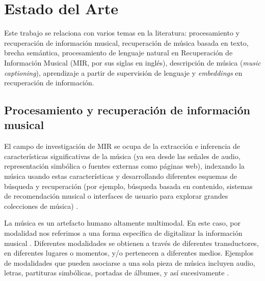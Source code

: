 \chapter{Estado del Arte}
\label{chap:sota}

Este trabajo se relaciona con varios temas en la literatura: procesamiento y recuperación de información musical, recuperación de música basada en texto, brecha semántica, procesamiento de lenguaje natural en Recuperación de Información Musical (MIR, por sus siglas en inglés), descripción de música (\textit{music captioning}), aprendizaje a partir de supervisión de lenguaje y \textit{embeddings} en recuperación de información.\\

\section{Procesamiento y recuperación de información musical}
\label{sec:MIR}

El campo de investigación de MIR se ocupa de la extracción e inferencia de características significativas de la música (ya sea desde las señales de audio, representación simbólica o fuentes externas como páginas web), indexando la música usando estas características y desarrollando diferentes esquemas de búsqueda y recuperación (por ejemplo, búsqueda basada en contenido, sistemas de recomendación musical o interfaces de usuario para explorar grandes colecciones de música) \cite{Schedl2014MusicIR}.

La música es un artefacto humano altamente multimodal. En este caso, por modalidad nos referimos a una forma específica de digitalizar la información musical \cite{Simonetta2019MultimodalMI}. Diferentes modalidades se obtienen a través de diferentes transductores, en diferentes lugares o momentos, y/o pertenecen a diferentes medios. Ejemplos de modalidades que pueden asociarse a una sola pieza de música incluyen audio, letras, partituras simbólicas, portadas de álbumes, y así sucesivamente \cite{Simonetta2019MultimodalMI, Schedl2014MusicIR}.

